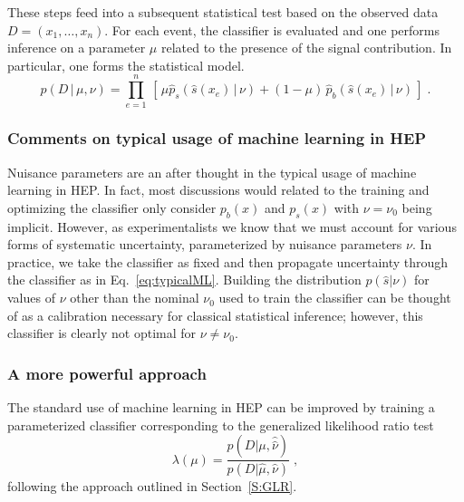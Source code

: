 \documentclass[12pt]{article}
\numberwithin{equation}{section}
\theoremstyle{plain}
\begin{document}
These steps feed into a subsequent statistical test based on the observed data
${D=(x_1, \dots, x_n)}$. For each event, the classifier is evaluated and one
performs inference on a parameter $\mu$ related to the presence of the signal
contribution. In particular, one forms the statistical model.
\begin{equation}\label{eq:typicalML}
p( D \,|\, \mu, \nu) = \prod_{e=1}^n \, \left[\, \mu \hat{p}_s( \hat s(x_e) \, |\,  \nu)  + (1-\mu)\, \hat{p}_b( \hat s(x_e) \,|\, \nu) \,\right] \; .
\end{equation}

\subsubsection{Comments on typical usage of machine learning in HEP}

Nuisance parameters are an after thought in the typical usage of machine
learning in HEP. In fact, most discussions would related to the training and
optimizing the classifier only consider $p_b(x)$ and $p_s(x)$ with $\nu=\nu_0$
being implicit. However, as experimentalists we know that we must account for
various forms of systematic uncertainty, parameterized by nuisance parameters
$\nu$. In practice, we take the classifier as fixed and then propagate
uncertainty through the classifier as in Eq.~\ref{eq:typicalML}. Building the
distribution $p(\hat s|\nu)$ for values of $\nu$ other than the nominal $\nu_0$
used to train the classifier can be thought of as a calibration necessary for
classical statistical inference; however, this classifier is clearly not optimal
for $\nu \ne \nu_0$.

\subsubsection{A more powerful  approach}

The standard use of machine learning in HEP can be improved by training a
parameterized classifier corresponding to the generalized likelihood ratio test
\begin{equation}
\lambda(\mu) = \frac{p(D|\mu, \hat{\hat{\nu}})}{p(D|\hat \mu, {\hat{\nu}})} \;,
\end{equation}
following the approach outlined in Section~\ref{S:GLR}.
\end{document}

